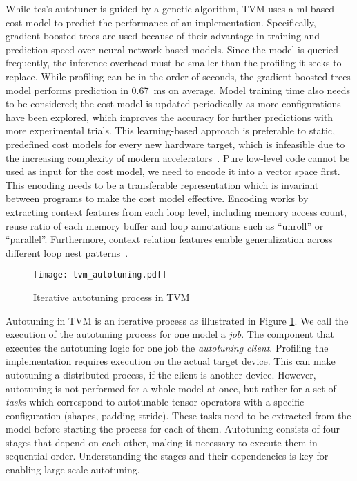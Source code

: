 While \glspl{tc}'s autotuner is guided by a genetic algorithm, TVM uses a \gls{ml}-based cost model to predict the performance of an implementation. Specifically, gradient boosted trees are used because of their advantage in training and prediction speed over neural network-based models. Since the model is queried frequently, the inference overhead must be smaller than the profiling it seeks to replace. While profiling can be in the order of seconds, the gradient boosted trees model performs prediction in \SI{0.67}{\milli\second} on average. Model training time also needs to be considered; the cost model is updated periodically as more configurations have been explored, which improves the accuracy for further predictions with more experimental trials. This learning-based approach is preferable to static, predefined cost models for every new hardware target, which is infeasible due to the increasing complexity of modern accelerators~\cite[p.~8~f.]{Chen.2018b}. Pure low-level code cannot be used as input for the cost model, we need to encode it into a vector space first. This encoding needs to be a transferable representation which is invariant between programs to make the cost model effective. Encoding works by extracting context features from each loop level, including memory access count, reuse ratio of each memory buffer and loop annotations such as \enquote{unroll} or \enquote{parallel}. Furthermore, context relation features enable generalization across different loop nest patterns~\cite[p.~4]{Chen.2018}.

\begin{figure}
	\centering
	\texttt{[image: tvm\_autotuning.pdf]}%
	\caption{Iterative autotuning process in TVM}
	\label{fig:tvm-autotuning}
\end{figure}

Autotuning in TVM is an iterative process as illustrated in Figure \ref{fig:tvm-autotuning}. We call the execution of the autotuning process for one model a \textit{job}. The component that executes the autotuning logic for one job the \textit{autotuning client}. Profiling the implementation requires execution on the actual target device. This can make autotuning a distributed process, if the client is another device. However, autotuning is not performed for a whole model at once, but rather for a set of \textit{tasks} which correspond to autotunable tensor operators with a specific configuration (shapes, padding stride). These tasks need to be extracted from the model before starting the process for each of them. Autotuning consists of four stages that depend on each other, making it necessary to execute them in sequential order. Understanding the stages and their dependencies is key for enabling large-scale autotuning.

